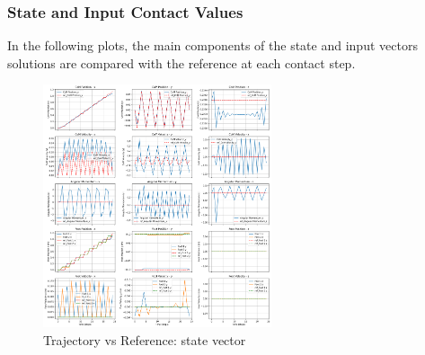 \documentclass[main.tex]{subfiles}
\begin{document}
\subsubsection{State and Input Contact Values}
In the following plots, the main components of the state and input vectors solutions are compared with the reference at each contact step.
\begin{figure}[htbp]
    \centering
    \includegraphics[width=0.6\textwidth]{figures/contact_x_walking.png}
    \caption{Trajectory vs Reference: state vector}
    \label{fig:contact_x_walking}
\end{figure}
\end{document}

